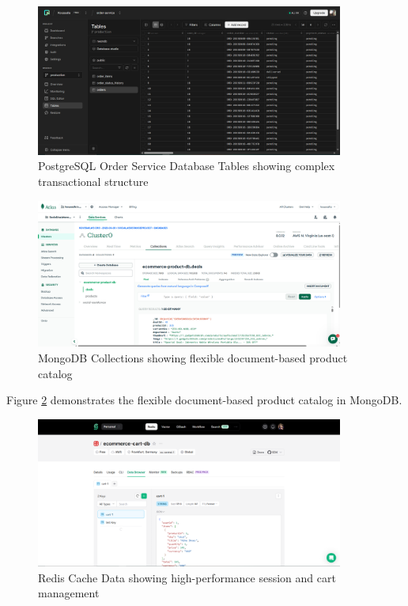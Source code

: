 \begin{figure}[H]
\centering
\includegraphics[width=0.9\textwidth]{figures/chapter5/postgresql-database-order-tables.png}
\caption{PostgreSQL Order Service Database Tables showing complex transactional structure}
\label{fig:postgresql-order-tables}
\end{figure}


\begin{figure}[H]
\centering
\includegraphics[width=0.9\textwidth]{figures/chapter5/mongodb-collections.png}
\caption{MongoDB Collections showing flexible document-based product catalog}
\label{fig:mongodb-collections}
\end{figure}

Figure \ref{fig:mongodb-collections} demonstrates the flexible document-based product catalog in MongoDB.

\begin{figure}[H]
\centering
\includegraphics[width=0.9\textwidth]{figures/chapter5/redis-cache-data.png}
\caption{Redis Cache Data showing high-performance session and cart management}
\label{fig:redis-cache-data}
\end{figure}

